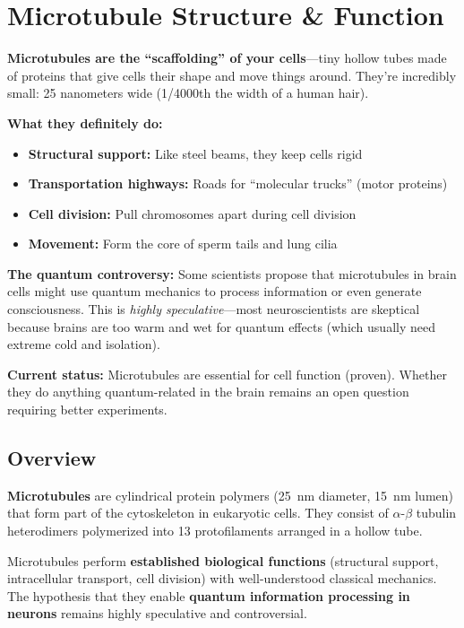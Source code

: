 \chapter{Microtubule Structure \& Function}
\label{ch:microtubule-structure-function}

\textbf{Microtubules are the ``scaffolding'' of your cells}---tiny hollow tubes made of proteins that give cells their shape and move things around. They're incredibly small: 25 nanometers wide (1/4000th the width of a human hair).

\textbf{What they definitely do:}
\begin{itemize}
\item \textbf{Structural support:} Like steel beams, they keep cells rigid
\item \textbf{Transportation highways:} Roads for ``molecular trucks'' (motor proteins)
\item \textbf{Cell division:} Pull chromosomes apart during cell division
\item \textbf{Movement:} Form the core of sperm tails and lung cilia
\end{itemize}

\textbf{The quantum controversy:} Some scientists propose that microtubules in brain cells might use quantum mechanics to process information or even generate consciousness. This is \emph{highly speculative}---most neuroscientists are skeptical because brains are too warm and wet for quantum effects (which usually need extreme cold and isolation).

\textbf{Current status:} Microtubules are essential for cell function (proven). Whether they do anything quantum-related in the brain remains an open question requiring better experiments.
\section{Overview}

\textbf{Microtubules} are cylindrical protein polymers (25~nm diameter, 15~nm lumen) that form part of the cytoskeleton in eukaryotic cells. They consist of $\alpha$-$\beta$ tubulin heterodimers polymerized into 13 protofilaments arranged in a hollow tube.

\begin{keyconcept}
Microtubules perform \textbf{established biological functions} (structural support, intracellular transport, cell division) with well-understood classical mechanics. The hypothesis that they enable \textbf{quantum information processing in neurons} remains highly speculative and controversial.
\end{keyconcept}

